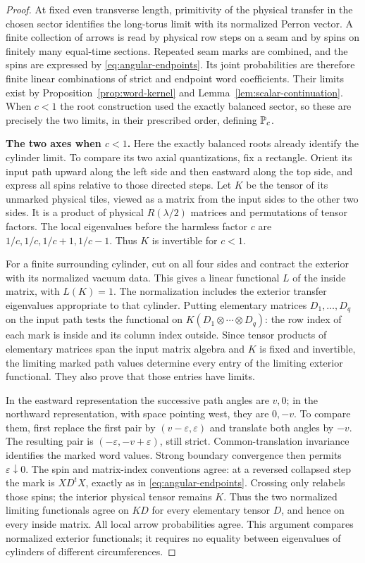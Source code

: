 \begin{proof}
At fixed even transverse length, primitivity of the physical transfer
in the chosen sector identifies the long-torus limit with its normalized
Perron vector.  A finite collection of arrows is read by physical row
steps on a seam and by spins on finitely many equal-time sections.
Repeated seam marks are combined, and the spins are expressed by
\eqref{eq:angular-endpoints}.  Its joint probabilities are therefore
finite linear combinations of strict and endpoint word coefficients.
Their limits exist by Proposition~\ref{prop:word-kernel} and
Lemma~\ref{lem:scalar-continuation}.  When $c<1$ the root construction
used the exactly balanced sector, so these are precisely the two limits,
in their prescribed order, defining $\P_c$.

\smallskip\noindent\textbf{The two axes when $c<1$.}
Here the exactly balanced roots already identify the cylinder limit.
To compare its two axial quantizations, fix a rectangle.  Orient its
input path upward along the left side and then eastward along the top
side, and express all spins relative to those directed steps.  Let $K$
be the tensor of its unmarked physical tiles, viewed as a matrix from
the input sides to the other two sides.  It is a product of physical
$R(\lambda/2)$ matrices and permutations of tensor factors.  The local
eigenvalues before the harmless factor $c$ are
$1/c,1/c,1/c+1,1/c-1$.  Thus $K$ is invertible for $c<1$.

For a finite surrounding cylinder, cut on all four sides and contract
the exterior with its normalized vacuum data.  This gives a linear
functional $L$ of the inside matrix, with $L(K)=1$.  The normalization
includes the exterior transfer eigenvalues appropriate to that cylinder.
Putting elementary matrices $D_1,\ldots,D_q$ on the input path tests
the functional on $K(D_1\otimes\cdots\otimes D_q)$: the row index of
each mark is inside and its column index outside.  Since tensor products
of elementary matrices span the input matrix algebra and $K$ is fixed
and invertible, the limiting marked path values determine every entry
of the limiting exterior functional.  They also prove that those
entries have limits.

In the eastward representation the successive path angles are $v,0$;
in the northward representation, with space pointing west, they are
$0,-v$.  To compare them, first replace the first pair by
$(v-\varepsilon,\varepsilon)$ and translate both angles by $-v$.
The resulting pair is $(-\varepsilon,-v+\varepsilon)$, still strict.
Common-translation invariance identifies the marked word values.
Strong boundary convergence then permits $\varepsilon\downarrow0$.
The spin and matrix-index conventions agree: at a reversed collapsed
step the mark is $XD^tX$, exactly as in
\eqref{eq:angular-endpoints}.  Crossing only relabels those spins; the
interior physical tensor remains $K$.  Thus the two normalized limiting
functionals agree on $KD$ for every elementary tensor $D$, and hence on
every inside matrix.  All local arrow probabilities agree.  This
argument compares normalized exterior functionals; it requires no
equality between eigenvalues of cylinders of different circumferences.


\end{proof}
